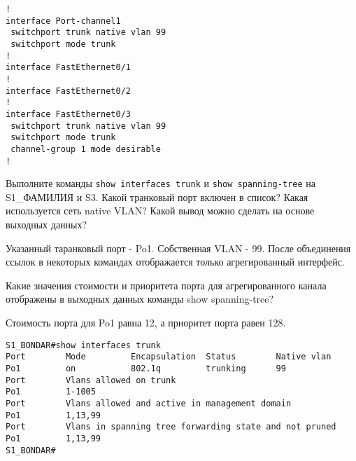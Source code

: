 \begin{verbatim}
!
interface Port-channel1
 switchport trunk native vlan 99
 switchport mode trunk
!
interface FastEthernet0/1
!
interface FastEthernet0/2
!
interface FastEthernet0/3
 switchport trunk native vlan 99
 switchport mode trunk
 channel-group 1 mode desirable
!
\end{verbatim}

Выполните команды \verb|show interfaces trunk| и \verb|show spanning-tree|
на S1\_ФАМИЛИЯ и S3.
Какой транковый порт включен в список?
Какая используется сеть native VLAN?
Какой вывод можно сделать на основе выходных данных?

Указанный таранковый порт - Po1.
Собственная VLAN - 99.
После объединения ссылок в некоторых командах отображается только
агрегированный интерфейс.

Какие значения стоимости и приоритета порта
для агрегированного канала отображены
в выходных данных команды show spanning-tree?

Стоимость порта для Po1 равна 12, а приоритет порта равен 128.

\begin{verbatim}
S1_BONDAR#show interfaces trunk
Port        Mode         Encapsulation  Status        Native vlan
Po1         on           802.1q         trunking      99
Port        Vlans allowed on trunk
Po1         1-1005
Port        Vlans allowed and active in management domain
Po1         1,13,99
Port        Vlans in spanning tree forwarding state and not pruned
Po1         1,13,99
S1_BONDAR#
\end{verbatim}

